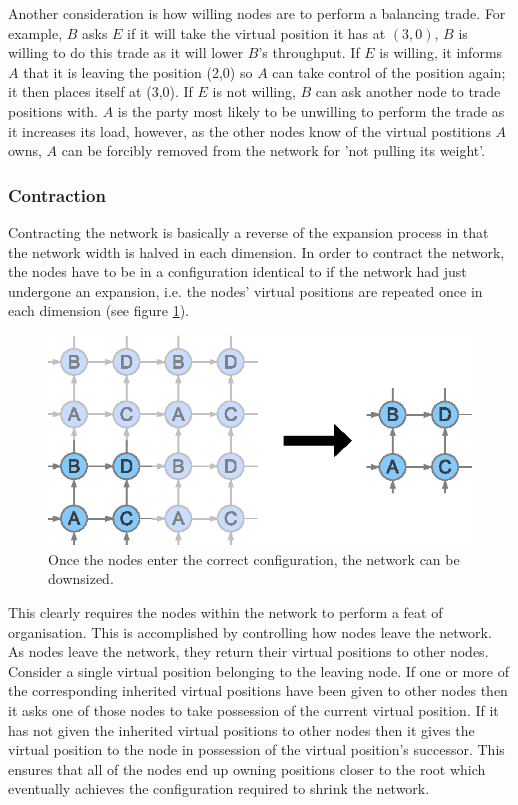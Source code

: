 \documentclass[ %
                    author={Luke Murray},
                supervisor={Dr. Simon Hollis},
                     title={Shadow Peer-to-Peer Networks},
                  subtitle={},
                    degree={MEng},
                      year={2013} ]{thesis}
\begin{document}
Another consideration is how willing nodes are to perform a balancing trade. For example, $B$ asks $E$ if it will take the virtual position it has at $(3,0)$, $B$ is willing to do this trade as it will lower $B$'s throughput. If $E$ is willing, it informs $A$ that it is leaving the position (2,0) so $A$ can take control of the position again; it then places itself at (3,0). If $E$ is not willing, $B$ can ask another node to trade positions with. $A$ is the party most likely to be unwilling to perform the trade as it increases its load, however, as the other nodes know of the virtual postitions $A$ owns, $A$ can be forcibly removed from the network for 'not pulling its weight'.

\subsubsection{Contraction}

Contracting the network is basically a reverse of the expansion process in that the network width is halved in each dimension. In order to contract the network, the nodes have to be in a configuration identical to if the network had just undergone an expansion, i.e. the nodes' virtual positions are repeated once in each dimension (see figure \ref{contraction}).

\begin{figure}[h]
    \centering
    \includegraphics{diagrams/network_contraction.eps}
    \caption{Once the nodes enter the correct configuration, the network can be downsized.}
    \label{contraction}
\end{figure}

This clearly requires the nodes within the network to perform a feat of organisation. This is accomplished by controlling how nodes leave the network. As nodes leave the network, they return their virtual positions to other nodes. Consider a single virtual position belonging to the leaving node. If one or more of the corresponding inherited virtual positions have been given to other nodes then it asks one of those nodes to take possession of the current virtual position. If it has not given the inherited virtual positions to other nodes then it gives the virtual position to the node in possession of the virtual position's successor. This ensures that all of the nodes end up owning positions closer to the root which eventually achieves the configuration required to shrink the network.
\end{document}

